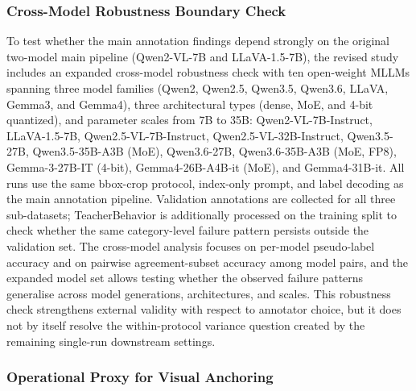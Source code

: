 \documentclass{ieeeaccess}
\begin{document}
\subsubsection{Cross-Model Robustness Boundary Check}

To test whether the main annotation findings depend strongly on the
original two-model main pipeline (Qwen2-VL-7B and LLaVA-1.5-7B), the
revised study includes an expanded cross-model robustness check with ten
open-weight MLLMs spanning three model families (Qwen2, Qwen2.5, Qwen3.5,
Qwen3.6, LLaVA, Gemma3, and Gemma4), three architectural types (dense,
MoE, and 4-bit quantized), and parameter scales from 7B to 35B:
Qwen2-VL-7B-Instruct, LLaVA-1.5-7B, Qwen2.5-VL-7B-Instruct,
Qwen2.5-VL-32B-Instruct, Qwen3.5-27B, Qwen3.5-35B-A3B (MoE),
Qwen3.6-27B, Qwen3.6-35B-A3B (MoE, FP8), Gemma-3-27B-IT (4-bit),
Gemma4-26B-A4B-it (MoE), and Gemma4-31B-it.
All runs use the same bbox-crop protocol, index-only prompt, and
label decoding as the main annotation pipeline.
Validation annotations are collected for all three sub-datasets;
TeacherBehavior is additionally processed on the training split to
check whether the same category-level failure pattern persists outside
the validation set.
The cross-model analysis focuses on per-model pseudo-label accuracy and
on pairwise agreement-subset accuracy among model pairs, and the
expanded model set allows testing whether the observed failure patterns
generalise across model generations, architectures, and scales.
This robustness check strengthens external validity with
respect to annotator choice, but it does not by itself resolve the
within-protocol variance question created by the remaining
single-run downstream settings.

\subsubsection{Operational Proxy for Visual Anchoring}
\end{document}

